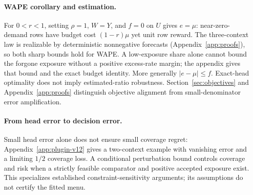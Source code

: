 \paragraph{WAPE corollary and estimation.}
For $0<r<1$, setting $\rho=1$, $W=Y$, and $f=0$ on $U$ gives
$e=\mu$: near-zero-demand rows have budget cost $(1-r)\mu$ yet
unit row reward. The three-context law is realizable by deterministic
nonnegative forecasts (Appendix~\ref{app:proofs}), so both sharp bounds
hold for WAPE. A low-exposure share alone cannot bound the forgone
exposure without a positive excess-rate margin; the appendix gives
that bound and the exact budget identity. More generally $|e-\mu|\leq f$.
Exact-head optimality does not imply estimated-ratio robustness.
Section~\ref{sec:objectives} and Appendix~\ref{app:proofs} distinguish
objective alignment from small-denominator error amplification.

\paragraph{From head error to decision error.}
Small head error alone does not ensure small coverage regret: Appendix~\ref{app:plugin-v12} gives a two-context example with vanishing error and a limiting $1/2$ coverage loss. A conditional perturbation bound controls coverage and risk when a strictly feasible comparator and positive accepted exposure exist. This specializes established constraint-sensitivity arguments; its assumptions do not certify the fitted menu.


